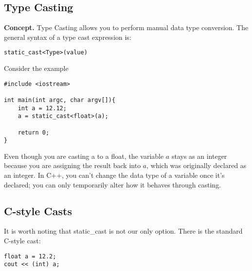 \documentclass{report}
\begin{document}
    \subsection{Type Casting}
    \bigbreak \noindent 
    \textbf{Concept.} Type Casting allows you to perform manual data type conversion. The general syntax of a type cast expression is:
    \bigbreak \noindent 
    \sepline
    \begin{verbatim}
static_cast<Type>(value)
    \end{verbatim}
    \sepline
    \bigbreak \noindent 
    Consider the example
    \smallbreak \noindent
    \sepline
    \begin{verbatim}
#include <iostream>

int main(int argc, char argv[]){
    int a = 12.12;
    a = static_cast<float>(a);

    return 0;
}
    \end{verbatim}
    \sepline
    \bigbreak \noindent 
    Even though you are casting a to a float, the variable $a$ stays as an integer because you are assigning the result back into $a$, which was originally declared as an integer. In C++, you can't change the data type of a variable once it's declared; you can only temporarily alter how it behaves through casting.

    \bigbreak \noindent 
    \subsection{C-style Casts}
    \bigbreak \noindent 
    It is worth noting that static\_cast is not our only option. There is the standard C-style cast:
    \bigbreak \noindent 
    \sepline
    \begin{verbatim}
float a = 12.2;
cout << (int) a;
    \end{verbatim}
    \sepline
    




    \pagebreak \bigbreak \noindent 
\end{document}
